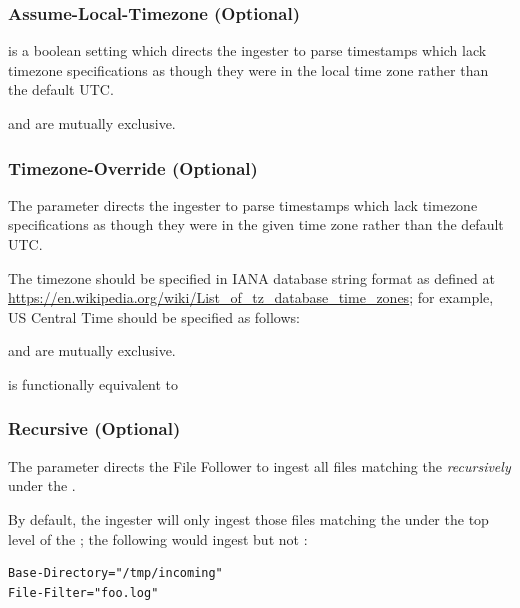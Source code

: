 \subsubsection{Assume-Local-Timezone (Optional)}

 is a boolean setting which directs the ingester
to parse timestamps which lack timezone specifications as though they
were in the local time zone rather than the default UTC.

 and  are mutually
exclusive.

\subsubsection{Timezone-Override (Optional)}

The  parameter directs the ingester to parse
timestamps which lack timezone specifications as though they were in the
given time zone rather than the default UTC.

The timezone should be specified in IANA database string format as
defined at \href{https://en.wikipedia.org/wiki/List\_of\_tz\_database\_time\_zones}{https://en.wikipedia.org/wiki/List\_of\_tz\_database\_time\_zones};
for example, US Central Time should be specified as follows:


 and  are mutually
exclusive.

 is functionally equivalent to

\subsubsection{Recursive (Optional)}

The  parameter directs the File Follower to ingest all
files matching the  \emph{recursively} under the
.

By default, the ingester will only ingest those files matching the
 under the top level of the ; the
following would ingest  but not
:

\begin{Verbatim}[breaklines=true]
Base-Directory="/tmp/incoming"
File-Filter="foo.log"
\end{Verbatim}

